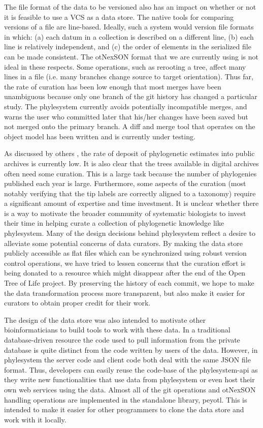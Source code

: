 \documentclass{bioinfo}
\newcommand{\ps}{phylesystem\xspace}
\newcommand{\otol}{Open Tree of Life\xspace}
\newcommand{\nexson}{otNexSON\xspace}
\begin{document}
The file format of the data to be versioned also has an impact on whether or not it is feasible
    to use a VCS as a data store.
The native tools for comparing versions of a file are line-based.
Ideally, such a system would version file formats in which:
    (a) each datum in a collection is described on a different line, 
    (b) each line is relatively independent, and 
    (c) the order of elements in the serialized file can be made consistent.
The \nexson format that we are currently using is not ideal in these respects.
Some operations, such as rerooting a tree,
    affect many lines in a file (i.e. many branches change source to target orientation).
Thus far, the rate of curation has been low enough that most merges have been unambiguous because
    only one branch of the git history has changed a particular study.
The \ps currently avoids potentially incompatible merges, and warns the user who committed later that his/her
    changes have been saved but not merged onto the primary branch.
A diff and merge tool that operates on the object model has been
    written and is currently under testing.

As discussed by others \citep{DrewEtAl2013,MageeMM2014}, the rate of deposit of phylogenetic
    estimates into public archives is currently low.
It is also clear that the trees available in digital archives often need some curation.
This is a large task because the number of phylogenies published each year is large.
Furthermore, some aspects of the curation (most notably verifying that the tip labels are correctly
    aligned to a taxonomy) require a significant amount of expertise and time investment.
It is unclear whether there is a way to motivate the broader community of systematic biologists to
    invest their time in helping curate a collection of phylogenetic knowledge like \ps.
Many of the design decisions behind \ps reflect a desire to alleviate some potential concerns
    of data curators.
By making the data store publicly accessible as flat files which can be synchronized using robust
    version control operations, we have tried to lessen
    concerns that the curation effort is being donated to a resource which might disappear
    after the end of the \otol project.
By preserving the history of each commit, we hope to make the data transformation process more 
    transparent, but also make it easier for curators to obtain proper credit for their work.

The design of the data store was also intended to motivate other bioinformaticians to
    build tools to work with these data.
In a traditional database-driven resource the code used to pull information from the private
    database is quite distinct from the code written by users of the data.
However, in \ps the server code and client code both deal with the same JSON file format.
Thus, developers can easily reuse the code-base of the \ps-api as they write new functionalities
    that use data from \ps or even host their own web services using the data.
Almost all of the git operations and \nexson handling operations are implemented in the standalone
    library, peyotl.
This is intended to make it easier for other programmers to clone
    the data store and work with it locally.
\end{document}
